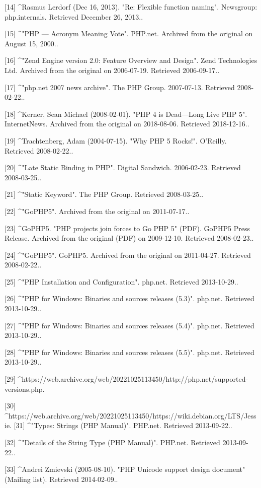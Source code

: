 [14]
^Rasmus Lerdorf (Dec 16, 2013). "Re: Flexible function naming". Newsgroup: php.internals. Retrieved December 26, 2013..

[15]
^"PHP — Acronym Meaning Vote". PHP.net. Archived from the original on August 15, 2000..

[16]
^"Zend Engine version 2.0: Feature Overview and Design". Zend Technologies Ltd. Archived from the original on 2006-07-19. Retrieved 2006-09-17..

[17]
^"php.net 2007 news archive". The PHP Group. 2007-07-13. Retrieved 2008-02-22..

[18]
^Kerner, Sean Michael (2008-02-01). "PHP 4 is Dead—Long Live PHP 5". 
InternetNews. Archived from the original on 2018-08-06. Retrieved 2018-12-16..

[19]
^Trachtenberg, Adam (2004-07-15). "Why PHP 5 Rocks!". O'Reilly. Retrieved 2008-02-22..

[20]
^"Late Static Binding in PHP". Digital Sandwich. 2006-02-23. Retrieved 2008-03-25..

[21]
^"Static Keyword". The PHP Group. Retrieved 2008-03-25..

[22]
^"GoPHP5". Archived from the original on 2011-07-17..

[23]
^GoPHP5. "PHP projects join forces to Go PHP 5" (PDF). GoPHP5 Press Release. Archived from the original (PDF) on 2009-12-10. Retrieved 2008-02-23..

[24]
^"GoPHP5". GoPHP5. Archived from the original on 2011-04-27. Retrieved 2008-02-22..

[25]
^"PHP Installation and Configuration". php.net. Retrieved 2013-10-29..

[26]
^"PHP for Windows: Binaries and sources releases (5.3)". php.net. Retrieved 2013-10-29..

[27]
^"PHP for Windows: Binaries and sources releases (5.4)". php.net. Retrieved 2013-10-29..

[28]
^"PHP for Windows: Binaries and sources releases (5.5)". php.net. Retrieved 2013-10-29..

[29]
^https://web.archive.org/web/20221025113450/http://php.net/supported-versions.php.

[30]
^https://web.archive.org/web/20221025113450/https://wiki.debian.org/LTS/Jessie.
[31]
^"Types: Strings (PHP Manual)". PHP.net. Retrieved 2013-09-22..

[32]
^"Details of the String Type (PHP Manual)". PHP.net. Retrieved 2013-09-22..

[33]
^Andrei Zmievski (2005-08-10). "PHP Unicode support design document" (Mailing list). Retrieved 2014-02-09..

